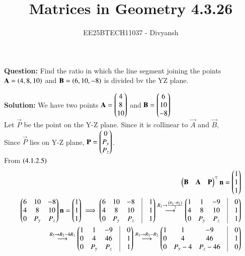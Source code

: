 \documentclass[journal,12pt,onecolumn]{IEEEtran}
\title{Matrices in Geometry 4.3.26}
\author{EE25BTECH11037 - Divyansh}
\theoremstyle{remark}
\begin{document}
\vspace{3cm}
\maketitle
{\let\newpage\relax\maketitle}
\textbf{Question: }
Find the ratio in which the line segment joining the points $\mathbf{A}=\left(4,8,10\right)$ and $\mathbf{B}=\left(6, 10, -8\right)$ is divided bv the YZ plane.
\vspace{2mm}

\textbf{Solution:}
 \vspace{1mm}
We have two points $\mathbf{A}=\begin{pmatrix}4\\ 8 \\  10\end{pmatrix}$ and $\mathbf{B}=\begin{pmatrix}6\\  10\\ -8\end{pmatrix}$\\
Let $\vec{P}$ be the point on the Y-Z plane. Since it is collinear to $\vec{A}$ and $\vec{B}$, \\
Since $\vec{P}$ lies on Y-Z plane, $\mathbf{P}=\begin{pmatrix}0 \\ P_y \\ P_z \end{pmatrix}$.\\ 
From $\left(4.1.2.5\right)$
\begin{align}
    \myvec{\vec{B} & \vec{A} & \vec{P}}^{\top} \vec{n}=\myvec{1 \\ 1 \\1}\\
    \myvec{6 &10&-8 \\ 4 & 8& 10 \\ 0& P_y & P_z}\vec{n}=\myvec{1 \\ 1 \\1} \implies \myvec{6&10&-8&\vrule&1\\4&8&10&\vrule&1\\0&P_y&P_z&\vrule&1}
    \overset{R_1 \rightarrow \frac{\brak{R_1 - R_2}}{2}}{\longrightarrow} \myvec{1&1&-9&\vrule&0\\4&8&10&\vrule&1\\0&P_y&P_z&\vrule&1}\\
    \overset{R_2 \rightarrow R_2 - 4R_1}{\longrightarrow} \myvec{1&1&-9&\vrule&0\\0&4&46&\vrule&1\\0&P_y&P_z&\vrule&1}\overset{R_3 \rightarrow R_3 - R_2}{\longrightarrow} \myvec{1&1&-9&\vrule&0\\0&4&46&\vrule&1\\0&P_y-4&P_z-46&\vrule&0}
\end{align}
\end{document}
